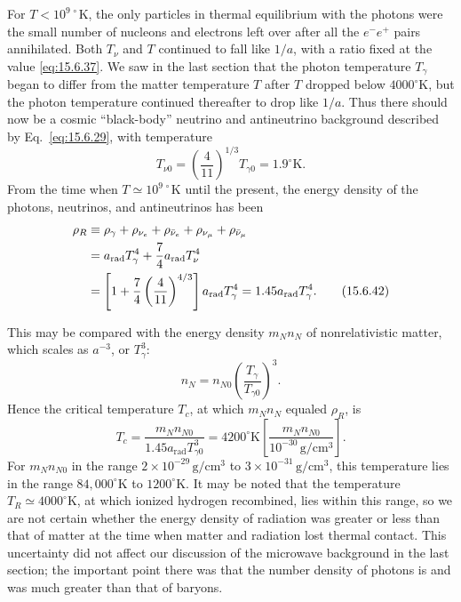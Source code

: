 For \(T<10^{9\,\circ}\mathrm K\), the only particles in thermal equilibrium
with the photons were the small number of nucleons and electrons left over
after all the \(e^-e^+\) pairs annihilated. Both \(T_\nu\) and \(T\)
continued to fall like \(1/a\), with a ratio fixed at the value
\eqref{eq:15.6.37}. We saw in the last section that the photon temperature
\(T_\gamma\) began to differ from the matter temperature \(T\) after \(T\)
dropped below \(4000^\circ\mathrm K\), but the photon temperature continued
thereafter to drop like \(1/a\). Thus there should now be a cosmic
``black-body'' neutrino and antineutrino background described by
Eq.~\eqref{eq:15.6.29}, with temperature
\[
  T_{\nu0}
  =
  \left(\frac4{11}\right)^{1/3}T_{\gamma0}
  =
  1.9^\circ\mathrm K.
\]
From the time when \(T\simeq10^{9\,\circ}\mathrm K\) until the present, the
energy density of the photons, neutrinos, and antineutrinos has been
\begin{align}
  \rho_R
  &\equiv
  \rho_\gamma+\rho_{\nu_e}+\rho_{\bar\nu_e}
  +\rho_{\nu_\mu}+\rho_{\bar\nu_\mu}
  \notag\\
  &=
  a_{\mathrm{rad}}T_\gamma^4
  +
  \frac74a_{\mathrm{rad}}T_\nu^4
  \notag\\
  &=
  \left[
    1+\frac74\left(\frac4{11}\right)^{4/3}
  \right]a_{\mathrm{rad}}T_\gamma^4
  =
  1.45a_{\mathrm{rad}}T_\gamma^4.
  \tag{15.6.42}\label{eq:15.6.42}
\end{align}

This may be compared with the energy density \(m_Nn_N\) of nonrelativistic
matter, which scales as \(a^{-3}\), or \(T_\gamma^3\):
\[
  n_N
  =
  n_{N0}\left(\frac{T_\gamma}{T_{\gamma0}}\right)^3.
\]
Hence the critical temperature \(T_c\), at which \(m_Nn_N\) equaled
\(\rho_R\), is
\begin{equation}
  T_c
  =
  \frac{m_Nn_{N0}}{1.45a_{\mathrm{rad}}T_{\gamma0}^3}
  =
  4200^\circ\mathrm K
  \left[
    \frac{m_Nn_{N0}}{10^{-30}\,\mathrm{g/cm^3}}
  \right].
  \tag{15.6.43}\label{eq:15.6.43}
\end{equation}
For \(m_Nn_{N0}\) in the range \(2\times10^{-29}\,\mathrm{g/cm^3}\) to
\(3\times10^{-31}\,\mathrm{g/cm^3}\), this temperature lies in the range
\(84{,}000^\circ\mathrm K\) to \(1200^\circ\mathrm K\). It may be noted that
the temperature \(T_R\simeq4000^\circ\mathrm K\), at which ionized hydrogen
recombined, lies within this range, so we are not certain whether the energy
density of radiation was greater or less than that of matter at the time when
matter and radiation lost thermal contact. This uncertainty did not affect our
discussion of the microwave background in the last section; the important
point there was that the number density of photons is and was much greater
than that of baryons.

